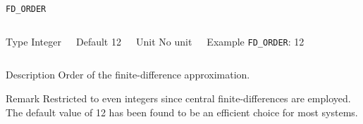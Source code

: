 \begin{frame}[allowframebreaks]{\texttt{FD\_ORDER}} \label{FD_ORDER}
\vspace*{-12pt}
\begin{columns}
\begin{block}{Type}
Integer
\end{block}

\begin{block}{Default}
12
\end{block}

\begin{block}{Unit}
No unit
\end{block}

\begin{block}{Example}
\texttt{FD\_ORDER}: 12
\end{block}
\end{columns}

\begin{block}{Description}
Order of the finite-difference approximation. 
\end{block}

\begin{block}{Remark}
Restricted to even integers since central finite-differences are employed. The default value of 12 has been found to be an efficient choice for most systems.
\end{block}

\end{frame}



